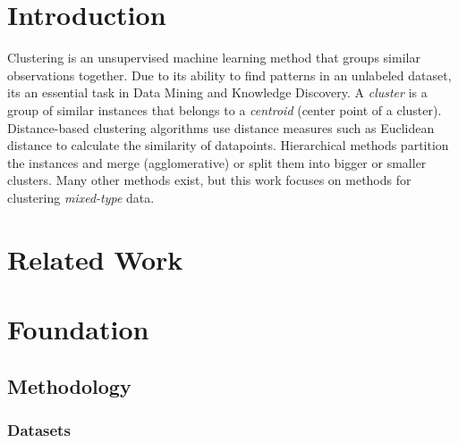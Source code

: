 \chapter{Introduction}

Clustering is an unsupervised machine learning method that groups similar observations together. Due to its ability to find patterns in an unlabeled dataset, its an essential task in Data Mining and Knowledge Discovery. A \textit{cluster} is a group of similar instances that belongs to a \textit{centroid} (center point of a cluster). Distance-based clustering algorithms use distance measures such as Euclidean distance to calculate the similarity of datapoints. Hierarchical methods partition the instances and merge (agglomerative) or split them into bigger or smaller clusters. Many other methods exist, but this work focuses on methods for clustering \textit{mixed-type} data. \cite{mixed_type_survey_2019}

\chapter{Related Work}

\chapter{Foundation}

\section{Methodology}

\subsection{Datasets} \label{Datasets}

